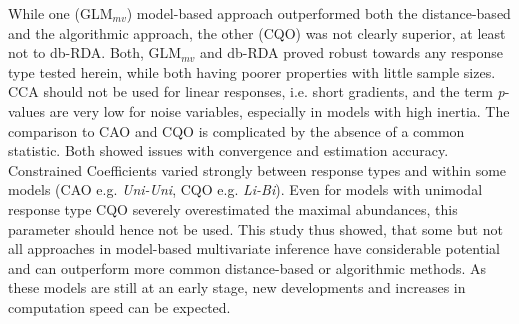 
	While one (GLM$_{mv}$) model-based approach outperformed both the distance-based and the algorithmic approach, the other (CQO) was not clearly superior, at least not to db-RDA.
	Both, GLM$_{mv}$ and db-RDA proved robust towards any response type tested herein, while both having poorer properties with little sample sizes. 
	CCA should not be used for linear responses, i.e. short gradients, and the term \textit{p}-values are very low for noise variables, especially in models with high inertia. 
	The comparison to CAO and CQO is complicated by the absence of a common statistic. 
	Both showed issues with convergence and estimation accuracy. 
	Constrained Coefficients varied strongly between response types and within some models (CAO e.g. \textit{Uni-Uni}, CQO e.g. \textit{Li-Bi}). 
	Even for models with unimodal response type CQO severely overestimated the maximal abundances, this parameter should hence not be used. 
	This study thus showed, that some but not all approaches in model-based multivariate inference have considerable potential and can outperform more common distance-based or algorithmic methods. 
	As these models are still at an early stage, new developments and increases in computation speed can be expected.   
	\\

	

